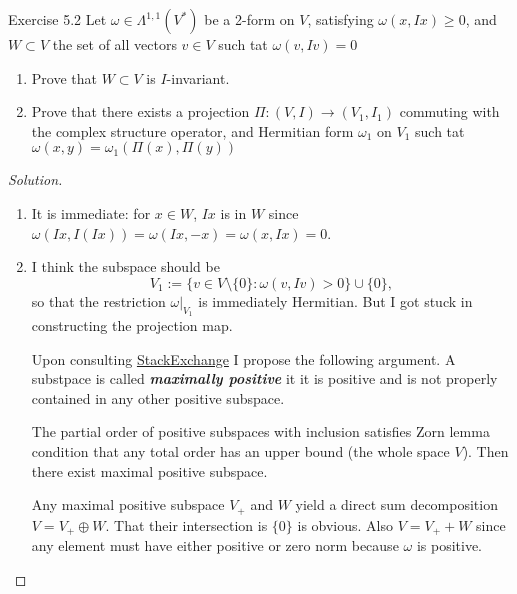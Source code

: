 \begin{thing4}{Exercise 5.2}\leavevmode
	Let $\omega\in\Lambda^{1,1}(V^*)$ be a 2-form on $V$, satisfying $\omega(x,Ix)\geq 0$, and $W\subset V$ the set of all vectors $v\in V$ such tat $\omega(v,Iv)=0$ 
	\begin{enumerate}[label=\alph*.]
		\item Prove that $W\subset V$ is $I$-invariant.
		\item Prove that there exists a projection $\Pi:(V,I)\to (V_1,I_1)$ commuting with the complex structure operator, and Hermitian form $\omega_1$ on $V_1$ such tat $\omega(x,y)=\omega_1(\Pi(x),\Pi(y))$
	
\end{enumerate}
\end{thing4}

\begin{proof}[Solution]\leavevmode
	\begin{enumerate}[label=\alph*.]
		\item It is immediate: for $ x\in W$, $Ix$ is in $W$ since  $\omega(Ix,I(Ix))=\omega(Ix,-x)=\omega(x,Ix)=0$.
		\item I think the subspace should be
			\[V_1:=\{v\in V\setminus\{0\}:\omega(v,Iv)>0\}\cup \{0\},\]
			so that the restriction $\omega|_{V_1}$ is immediately Hermitian. {\color{3}But I got stuck in constructing the projection map.}

		Upon consulting \href{https://mathoverflow.net/questions/7709/splitting-a-space-into-positive-and-negative-parts}{StackExchange} I propose the following argument. A substpace is called \textit{\textbf{maximally positive}} it it is positive and is not properly contained in any other positive  subspace.

		The partial order of positive subspaces with inclusion satisfies Zorn lemma condition that any total order has an upper bound (the whole space  $V$). Then there exist maximal positive subspace.

		Any maximal positive subspace $V_+$ and $W$ yield a direct sum decomposition  $V=V_+\oplus W$. That their intersection is  $\{0\}$ is obvious. Also $V=V_+ +W$ since any element must have either positive or zero norm because $\omega$ is positive.

\iffalse
		Consider the map
			\begin{align*}
				\omega^\flat: V &\longrightarrow V^* \\
				v &\longmapsto \omega(v,I\cdot)
			\end{align*}
			Then $\ker \omega^\flat=\{w\in V:\omega(v,Iw)=0\forall v\in V_1\}$.\fi
		\end{enumerate}
\end{proof}

